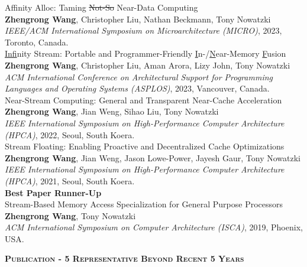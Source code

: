 \documentclass[a4paper]{article}
\newenvironment{changemargin}[2]{%
  \begin{list}{}{%
    \setlength{\topsep}{0pt}%
    \setlength{\leftmargin}{#1}%
    \setlength{\rightmargin}{#2}%
    \setlength{\listparindent}{\parindent}%
    \setlength{\itemindent}{\parindent}%
    \setlength{\parsep}{\parskip}%
  }%
  \item[]}{\end{list}
}
\newcommand{\lineover}{
	\begin{changemargin}{-0.05in}{-0.05in}
		\vspace*{-8pt}
		\hrulefill \\
		\vspace*{-2pt}
	\end{changemargin}
}
\newcommand{\header}[1]{
	\begin{changemargin}{-0.5in}{-0.5in}
		\scshape{\large \textbf{#1}}\\
  	\lineover
	\end{changemargin}
}
\newenvironment{body} {
	\vspace*{-16pt}
	\begin{changemargin}{-0.5in}{-0.5in}
  }	
	{\end{changemargin}
}
\begin{document}
\begin{body}
	\vspace{14pt}
    Affinity Alloc: Taming \sout{Not-So} Near-Data Computing \\
	\textbf{Zhengrong Wang}, Christopher Liu, Nathan Beckmann, Tony Nowatzki \\
	\emph{IEEE/ACM International Symposium on Microarchitecture (MICRO)}, 2023, Toronto, Canada.\\
	\vspace{6pt}
    \underline{Inf}inity Stream: Portable and Programmer-Friendly \underline{I}n-/\underline{N}ear-Memory \underline{F}usion \\
	\textbf{Zhengrong Wang}, Christopher Liu, Aman Arora, Lizy John, Tony Nowatzki \\
	\emph{ACM International Conference on Architectural Support for Programming Languages and Operating Systems (ASPLOS)}, 2023, Vancouver, Canada.\\
	\vspace{6pt}
	Near-Stream Computing: General and Transparent Near-Cache Acceleration \\
	\textbf{Zhengrong Wang}, Jian Weng, Sihao Liu, Tony Nowatzki \\
	\emph{IEEE International Symposium on High-Performance Computer Architecture (HPCA)}, 2022, Seoul, South Koera.\\
	\vspace{6pt}
	Stream Floating: Enabling Proactive and Decentralized Cache Optimizations \\
	\textbf{Zhengrong Wang}, Jian Weng, Jason Lowe-Power, Jayesh Gaur, Tony Nowatzki \\
	\emph{IEEE International Symposium on High-Performance Computer Architecture (HPCA)}, 2021, Seoul, South Koera.\\
	\textbf{Best Paper Runner-Up} \\
	\vspace{6pt}
	Stream-Based Memory Access Specialization for General Purpose Processors\\
	\textbf{Zhengrong Wang}, Tony Nowatzki \\
	\emph{ACM International Symposium on Computer Architecture (ISCA)}, 2019, Phoenix, USA.\\
\end{body}

\smallskip
\smallskip

\header{Publication - 5 Representative Beyond Recent 5 Years}
\end{document}
